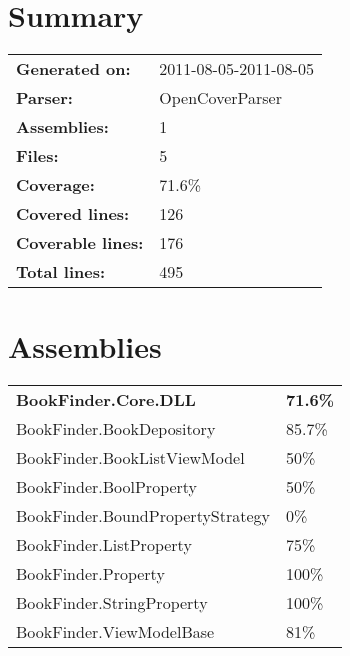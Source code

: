 \documentclass[a4paper,10pt]{article}
\begin{document}
\setcounter{secnumdepth}{-1}
\section{Summary}
\begin{longtable}[l]{ll}
\textbf{Generated on:} & 2011-08-05-2011-08-05\\
\textbf{Parser:} & OpenCoverParser\\
\textbf{Assemblies:} & 1\\
\textbf{Files:} & 5\\
\textbf{Coverage:} & 71.6\%\\
\textbf{Covered lines:} & 126\\
\textbf{Coverable lines:} & 176\\
\textbf{Total lines:} & 495\\
\end{longtable}
\section{Assemblies}
\begin{longtable}[l]{ll}
\textbf{BookFinder.Core.DLL} & \textbf{71.6\%}\\
BookFinder.BookDepository & 85.7\%\\
BookFinder.BookListViewModel & 50\%\\
BookFinder.BoolProperty & 50\%\\
BookFinder.BoundPropertyStrategy & 0\%\\
BookFinder.ListProperty & 75\%\\
BookFinder.Property & 100\%\\
BookFinder.StringProperty & 100\%\\
BookFinder.ViewModelBase & 81\%\\
\end{longtable}
\end{document}
